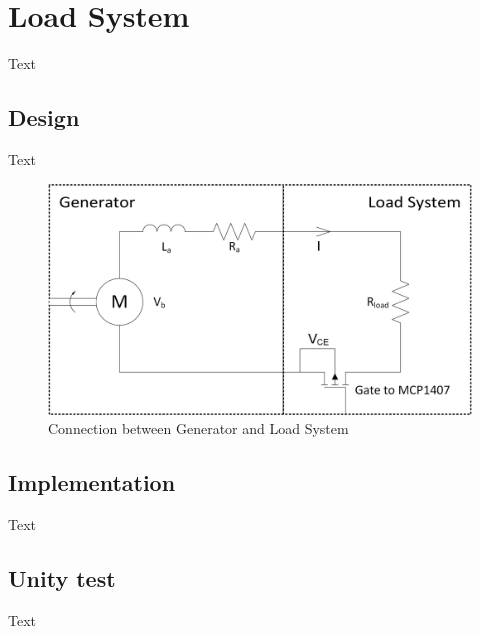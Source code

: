 \section{Load System}
Text

\subsection{Design}
Text

\begin{figure}[H]
	\centering
	\includegraphics[width=0.7\linewidth]{Hardware/Pictures/Load_System}
	\caption{Connection between Generator and Load System}
	\label{fig:Load_System}
\end{figure}

\subsection{Implementation}
Text

\subsection{Unity test}
Text